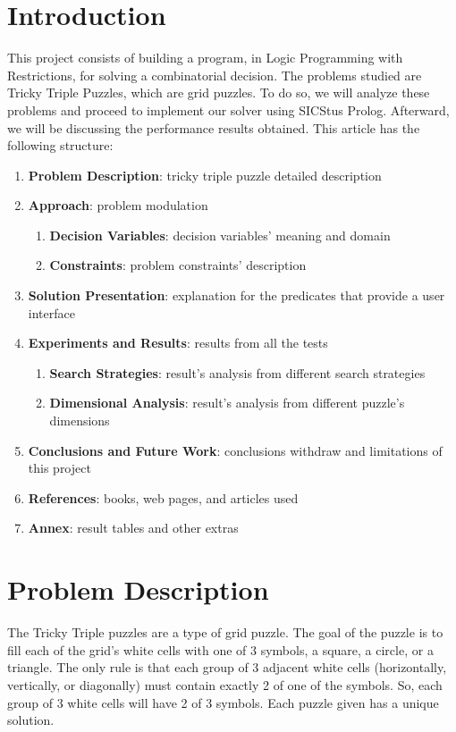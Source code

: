 \documentclass[runningheads]{llncs}
\begin{document}
\section{Introduction}
This project consists of building a program, in Logic Programming with Restrictions,
    for solving a combinatorial decision.
The problems studied are Tricky Triple Puzzles, which are grid puzzles. 
To do so, we will analyze these problems and proceed to implement our solver using SICStus Prolog.
Afterward, we will be discussing the performance results obtained.
This article has the following structure:
\begin{enumerate}
    \item \textbf{Problem Description}: tricky triple puzzle detailed description
    \item \textbf{Approach}: problem modulation
        \begin{enumerate}
            \item \textbf{Decision Variables}: decision variables' meaning and domain
            \item \textbf{Constraints}: problem constraints' description
        \end{enumerate}
    \item \textbf{Solution Presentation}: explanation for the predicates that provide a user interface
    \item \textbf{Experiments and Results}: results from all the tests
        \begin{enumerate}
            \item \textbf{Search Strategies}: result's analysis from different search strategies
            \item \textbf{Dimensional Analysis}: result's analysis from different puzzle's dimensions
        \end{enumerate}
    \item \textbf{Conclusions and Future Work}: conclusions withdraw and limitations of this project
    \item \textbf{References}: books, web pages, and articles used
    \item \textbf{Annex}: result tables and other extras
\end{enumerate}

\section{Problem Description}
The Tricky Triple puzzles are a type of grid puzzle.
The goal of the puzzle is to fill each of the grid’s white cells with one of 3 symbols,
a square, a circle, or a triangle.
The only rule is that each group of 3 adjacent white cells
    (horizontally, vertically, or diagonally) must contain exactly 2 of one of the symbols.
So, each group of 3 white cells will have 2 of 3 symbols.
Each puzzle given has a unique solution.
\end{document}
